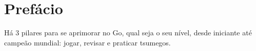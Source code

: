 \chapter{Prefácio}
  
Há 3 pilares para se aprimorar no Go, qual seja o seu nível, desde iniciante até campeão mundial: jogar, revisar e praticar tsumegos.